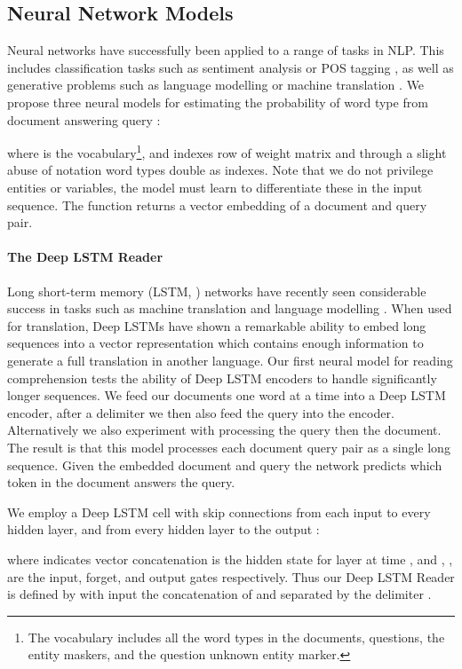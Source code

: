 \documentclass{article}
\begin{document}
\subsection{Neural Network Models}
Neural networks have successfully been applied to a range of tasks in NLP.
This includes classification tasks such as sentiment analysis
\cite{Kalchbrenner:2014:DCNN} or POS tagging \cite{Collobert:2011:NLP}, as well
as generative problems such as language modelling or machine translation
\cite{Sutskever:2014:SSLNN}.
We propose three neural models for estimating the probability of word type 
from document  answering query :

where  is the vocabulary\footnote{The vocabulary includes all the word types
  in the documents, questions, the entity maskers, and the question unknown
  entity marker.},
and  indexes row  of weight matrix  and through a slight abuse of
notation word types double as indexes. Note that we do not privilege entities or
variables, the model must learn to differentiate these in the input sequence.
The function  returns a vector embedding of a document and query pair.

\paragraph{The Deep LSTM Reader}
Long short-term memory (LSTM, \cite{Hochreiter:1997:LSTM}) networks have
recently seen considerable success in tasks such as machine translation and
language modelling \cite{Sutskever:2014:SSLNN}. When used for translation, Deep
LSTMs \cite{Graves:2012:SSLRNN} have shown a remarkable ability to embed long
sequences into a vector representation which contains enough information to
generate a full translation in another language. Our first neural model for
reading comprehension tests the ability of Deep LSTM encoders to handle
significantly longer sequences. We feed our documents one word at a time into
a Deep LSTM encoder, after a delimiter we then also feed the query into the
encoder. Alternatively we also experiment with processing the query then the
document. The result is that this model processes each document query pair as a
single long sequence. Given the embedded document and query the network
predicts which token in the document answers the query.

We employ a Deep LSTM cell with skip connections from each input  to every
hidden layer, and from every hidden layer to the output :

where  indicates vector concatenation  is the hidden state for layer
 at time , and , ,  are the input, forget, and
output gates respectively.
Thus our Deep LSTM Reader is defined by  with input  the concatenation of  and  separated by the delimiter .
\end{document}
